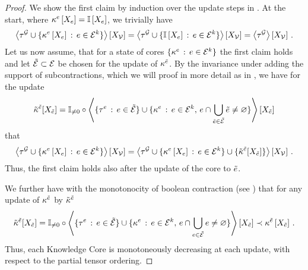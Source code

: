 \begin{proof}
    We show the first claim by induction over the update steps in .
    At the start, where $\kappa^{e}\left[X_{e}\right] = \mathbb{I}\left[X_{e}\right]$, we trivially have
    \begin{align*}
        \left\langle \tau^{\mathcal{G}} \cup \{\kappa^{e}\left[X_{e}\right] \, : \, e\in\mathcal{E}^{k}\}\right\rangle \left[ X_{\mathcal{V}} \right]
        = \left\langle \tau^{\mathcal{G}} \cup \{\mathbb{I}\left[X_{e}\right] \, : \, e\in\mathcal{E}^{k}\}\right\rangle \left[ X_{\mathcal{V}} \right]
        = \left\langle \tau^{\mathcal{G}}\right\rangle \left[ X_{\mathcal{V}} \right] \, .
    \end{align*}
    Let us now assume, that for a state of cores $\{\kappa^{e} \, : \, e\in\mathcal{E}^{k}\}$ the first claim holds and let $\tilde{\mathcal{E}}\subset\mathcal{E}$ be chosen for the update of $\kappa^{\tilde{e}}$.
    By the invariance under adding the support of subcontractions, which we will proof in more detail as  in , we have for the update
    \begin{align*}
        \tilde{\kappa}^{\tilde{e}}[X_{\tilde{e}}]
        = \mathbb{I}_{\neq0}\circ\left\langle 
            \{\tau^{e} \, : \, e\in\tilde{\mathcal{E}}\} \cup \{\kappa^{e} \, : \, e\in\mathcal{E}^{k}, \, e\cap\bigcup_{\tilde{e}\in\tilde{\mathcal{E}}}\tilde{e}\neq\varnothing  \}
        \right\rangle \left[ X_{\tilde{e}} \right]
    \end{align*}
    that
    \begin{align*}
        \left\langle \tau^{\mathcal{G}} \cup \{\kappa^{e}\left[X_{e}\right] \, : \, e\in\mathcal{E}^{k}\}\right\rangle \left[ X_{\mathcal{V}} \right]
        = \left\langle \tau^{\mathcal{G}} \cup \{\kappa^{e}\left[X_{e}\right] \, : \, e\in\mathcal{E}^{k}\} \cup \{\tilde{\kappa}^{\tilde{e}}[X_{\tilde{e}}]\}
        \right\rangle \left[ X_{\mathcal{V}} \right]  \, .
    \end{align*}
    Thus, the first claim holds also after the update of the core to $\tilde{e}$.

    We further have with the monotonocity of boolean contraction (see ) that for any update of $\kappa^{\tilde{e}}$ by $\tilde{\kappa}^{\tilde{e}}$
    \begin{align*}
        \tilde{\kappa}^{\tilde{e}}[X_{\tilde{e}}]
        = \mathbb{I}_{\neq0}\circ\left\langle 
            \{\tau^{e} \, : \, e\in\tilde{\mathcal{E}}\}
            \cup \{\kappa^{e} \, : \, e\in\mathcal{E}^{k}, \, e\cap\bigcup_{e\in\tilde{\mathcal{E}}}e\neq\varnothing\}
        \right\rangle \left[ X_{\tilde{e}} \right]
        \prec \kappa^{\tilde{e}}\left[X_{\tilde{e}}\right] \, .
    \end{align*}
    Thus, each Knowledge Core is monotoneously decreasing at each update, with respect to the partial tensor ordering.


\end{proof}
